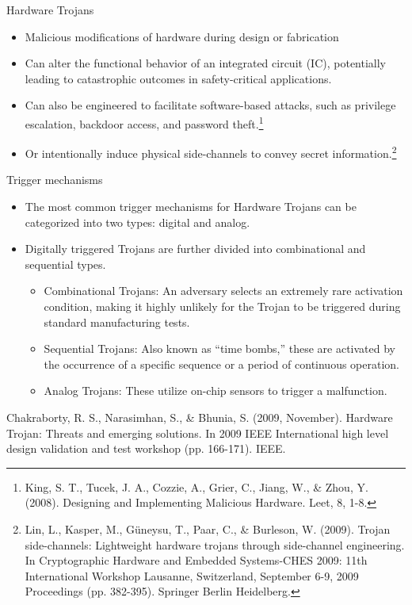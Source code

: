 \begin{frame}{Hardware Trojans}
    \begin{itemize}
        \item Malicious modifications of hardware during design or fabrication
        \item Can alter the functional behavior of an integrated circuit (IC), potentially leading to catastrophic outcomes in safety-critical applications.
        \item Can also be engineered to facilitate software-based attacks, such as privilege escalation, backdoor access, and password theft.\footnote{King, S. T., Tucek, J. A., Cozzie, A., Grier, C., Jiang, W., \& Zhou, Y. (2008). Designing and Implementing Malicious Hardware. Leet, 8, 1-8.}
        \item Or intentionally induce physical side-channels to convey secret information.\footnote{Lin, L., Kasper, M., Güneysu, T., Paar, C., \& Burleson, W. (2009). Trojan side-channels: Lightweight hardware trojans through side-channel engineering. In Cryptographic Hardware and Embedded Systems-CHES 2009: 11th International Workshop Lausanne, Switzerland, September 6-9, 2009 Proceedings (pp. 382-395). Springer Berlin Heidelberg.}
    \end{itemize}
\end{frame}

\begin{frame}{Trigger mechanisms}
    \begin{itemize}
        \item The most common trigger mechanisms for Hardware Trojans can be categorized into two types: digital and analog. 
        \item Digitally triggered Trojans are further divided into combinational and sequential types.
        \begin{itemize}
            \item Combinational Trojans: An adversary selects an extremely rare activation condition, making it highly unlikely for the Trojan to be triggered during standard manufacturing tests.
            \item Sequential Trojans: Also known as ``time bombs,'' these are activated by the occurrence of a specific sequence or a period of continuous operation.
            \item Analog Trojans: These utilize on-chip sensors to trigger a malfunction.
        \end{itemize}
    \end{itemize}
\vfill
{\small Chakraborty, R. S., Narasimhan, S., \& Bhunia, S. (2009, November). Hardware Trojan: Threats and emerging solutions. In 2009 IEEE International high level design validation and test workshop (pp. 166-171). IEEE.}
\end{frame}

